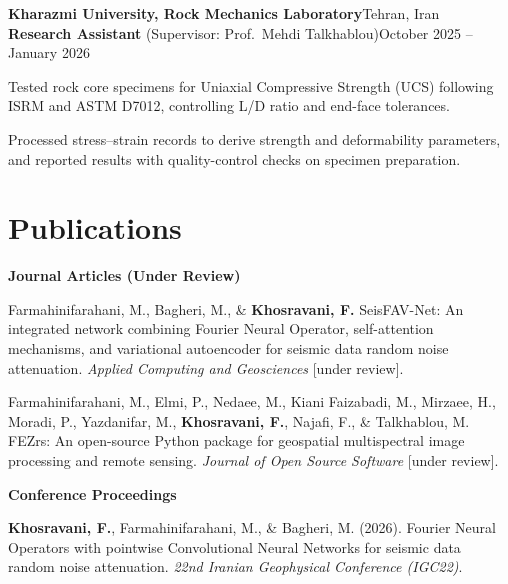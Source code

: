 \documentclass[11pt]{article}
\newcommand{\entry}[4]{%
  \textbf{#1}\hfill #2\\
  #3\hfill #4\par}
\begin{document}
\vspace{5pt}
\entry{Kharazmi University, Rock Mechanics Laboratory}{Tehran, Iran}
      {\textbf{Research Assistant} (Supervisor: Prof.~Mehdi Talkhablou)}{October 2025 -- January 2026}
\begin{cvitems}
  \item Tested rock core specimens for Uniaxial Compressive Strength (UCS) following
        ISRM and ASTM D7012, controlling L/D ratio and end-face tolerances.
  \item Processed stress--strain records to derive strength and deformability parameters,
        and reported results with quality-control checks on specimen preparation.
\end{cvitems}

\section*{Publications}
\textbf{Journal Articles (Under Review)}
\begin{enumerate}[label={[\arabic*]}, leftmargin=2.0em, noitemsep, topsep=2pt, parsep=0pt]
  \item Farmahinifarahani, M., Bagheri, M., \& \textbf{Khosravani, F.} SeisFAV-Net: An integrated
        network combining Fourier Neural Operator, self-attention mechanisms, and variational
        autoencoder for seismic data random noise attenuation.
        \textit{Applied Computing and Geosciences} [under review].
  \item Farmahinifarahani, M., Elmi, P., Nedaee, M., Kiani Faizabadi, M., Mirzaee, H., Moradi, P.,
        Yazdanifar, M., \textbf{Khosravani, F.}, Najafi, F., \& Talkhablou, M.
        FEZrs: An open-source Python package for geospatial multispectral image processing and
        remote sensing. \textit{Journal of Open Source Software} [under review].
\end{enumerate}

\vspace{4pt}
\textbf{Conference Proceedings}
\begin{enumerate}[label={[\arabic*]}, start=3, leftmargin=2.0em, noitemsep, topsep=2pt, parsep=0pt]
  \item \textbf{Khosravani, F.}, Farmahinifarahani, M., \& Bagheri, M. (2026). Fourier Neural
        Operators with pointwise Convolutional Neural Networks for seismic data random noise
        attenuation. \textit{22nd Iranian Geophysical Conference (IGC22)}.
\end{enumerate}
\end{document}
